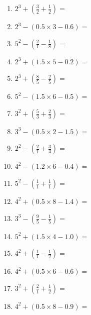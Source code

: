 \documentclass[12pt]{article}
\begin{document}
\begin{enumerate}
\item \large $ 2^{3} + (\frac{3}{2} + \frac{1}{2}) = $ \vspace{1.6cm}
\item \large $ 2^{3} - (0.5 \times 3 - 0.6) = $ \vspace{1.6cm}
\item \large $ 5^{2} - (\frac{2}{1} - \frac{1}{8}) = $ \vspace{1.6cm}
\item \large $ 2^{3} + (1.5 \times 5 - 0.2) = $ \vspace{1.6cm}
\newpage
\item \large $ 2^{3} + (\frac{8}{5} - \frac{2}{5}) = $ \vspace{1.6cm}
\item \large $ 5^{2} - (1.5 \times 6 - 0.5) = $ \vspace{1.6cm}
\item \large $ 3^{2} + (\frac{5}{3} + \frac{2}{3}) = $ \vspace{1.6cm}
\item \large $ 3^{3} - (0.5 \times 2 - 1.5) = $ \vspace{1.6cm}
\item \large $ 2^{2} - (\frac{2}{1} + \frac{3}{4}) = $ \vspace{1.6cm}
\item \large $ 4^{2} - (1.2 \times 6 - 0.4) = $ \vspace{1.6cm}
\item \large $ 5^{2} - (\frac{1}{1} + \frac{1}{1}) = $ \vspace{1.6cm}
\item \large $ 4^{2} + (0.5 \times 8 - 1.4) = $ \vspace{1.6cm}
\item \large $ 3^{3} - (\frac{9}{5} - \frac{1}{5}) = $ \vspace{1.6cm}
\item \large $ 5^{2} + (1.5 \times 4 - 1.0) = $ \vspace{1.6cm}
\newpage
\item \large $ 4^{2} + (\frac{1}{1} - \frac{1}{2}) = $ \vspace{1.6cm}
\item \large $ 4^{2} + (0.5 \times 6 - 0.6) = $ \vspace{1.6cm}
\item \large $ 3^{2} + (\frac{2}{1} + \frac{1}{2}) = $ \vspace{1.6cm}
\item \large $ 4^{2} + (0.5 \times 8 - 0.9) = $ \vspace{1.6cm}

\end{enumerate}
\end{document}
